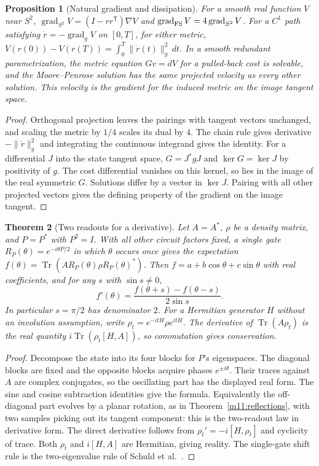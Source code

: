 \documentclass[11pt,reqno]{amsart}
\newtheorem{theorem}{Theorem}[section]
\newtheorem{proposition}[theorem]{Proposition}
\theoremstyle{definition}
\theoremstyle{remark}
\numberwithin{equation}{section}
\begin{document}
\begin{proposition}[Natural gradient and dissipation]\label{m11:gradient}
For a smooth real function $V$ near $S^2$,
$\operatorname{grad}_{S^2} V=(I-rr^{\mathsf T})\nabla V$ and
$\operatorname{grad}_{\rm FS}V=4\operatorname{grad}_{S^2}V$.
For a $C^1$ path satisfying $\dot r=-\operatorname{grad}_g V$
on $[0,T]$, for either metric,
$V(r(0))-V(r(T))=\int_0^T\|\dot r(t)\|_g^2\,dt$.
In a smooth redundant parametrization, the metric equation
$Gv=dV$ for a pulled-back cost is solvable, and the Moore--Penrose
solution has the same projected velocity as every other solution.
This velocity is the gradient for the induced metric on the
image tangent space.
\end{proposition}
\begin{proof}
Orthogonal projection leaves the pairings with tangent vectors
unchanged, and scaling the metric by $1/4$ scales its dual by $4$.
The chain rule gives derivative $-\|\dot r\|_g^2$ and integrating
the continuous integrand gives the identity. For a differential $J$
into the state tangent space, $G=J^*gJ$ and $\ker G=\ker J$ by
positivity of $g$. The cost differential vanishes on this kernel,
so lies in the image of the real symmetric $G$. Solutions differ
by a vector in $\ker J$. Pairing with all other projected vectors
gives the defining property of the gradient on the image tangent.
\end{proof}

\begin{theorem}[Two readouts for a derivative]\label{m11:shift}
Let $A=A^*$, $\rho$ be a density matrix, and $P=P^*$ with $P^2=I$.
With all other circuit factors fixed, a single gate
$R_P(\theta)=e^{-i\theta P/2}$ in which $\theta$ occurs once gives the
expectation $f(\theta)=\operatorname{Tr}(A R_P(\theta)\rho R_P(\theta)^*)$.
Then $f=a+b\cos\theta+c\sin\theta$ with real coefficients, and
for any $s$ with $\sin s\ne0$,
\[
 f'(\theta)=\frac{f(\theta+s)-f(\theta-s)}{2\sin s}.
\]
In particular $s=\pi/2$ has denominator $2$. For a Hermitian
generator $H$ without an involution assumption, write
$\rho_t=e^{-itH}\rho e^{itH}$. The derivative of
$\operatorname{Tr}(A\rho_t)$ is the real quantity
$i\operatorname{Tr}(\rho_t[H,A])$, so commutation gives conservation.
\end{theorem}
\begin{proof}
Decompose the state into its four blocks for $P$'s eigenspaces.
The diagonal blocks are fixed and the opposite blocks acquire
phases $e^{\pm i\theta}$. Their traces against $A$ are complex
conjugates, so the oscillating part has the displayed real form.
The sine and cosine subtraction identities give the formula.
Equivalently the off-diagonal part evolves by a planar rotation,
as in Theorem~\ref{m11:reflections}, with two samples picking out
its tangent component: this is the two-readout law in derivative form.
The direct derivative follows from $\rho_t'=-i[H,\rho_t]$ and cyclicity
of trace. Both $\rho_t$ and $i[H,A]$ are Hermitian, giving reality.
The single-gate shift rule is the two-eigenvalue rule of
Schuld et al.\ \cite{m11:Schuld}.
\end{proof}
\end{document}
